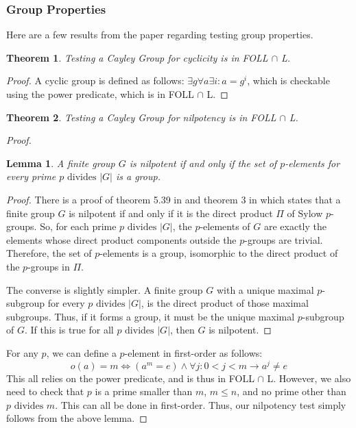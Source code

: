 \documentclass[a4paper,12pt]{article}
\theoremstyle{plain}
\newtheorem{theorem}{Theorem}
\newtheorem{lemma}{Lemma}
\theoremstyle{definition}
\theoremstyle{remark}
\begin{document}
\subsubsection{Group Properties}
Here are a few results from the paper regarding testing group properties.
\begin{theorem}
  Testing a Cayley Group for cyclicity is in FOLL $\cap$ L.
\end{theorem}
\begin{proof}
  A cyclic group is defined as follows: $\exists g\forall a\exists i:a=g^i$, which is checkable using the power predicate, which is in FOLL $\cap$ L.
\end{proof}
\begin{theorem}
  Testing a Cayley Group for nilpotency is in FOLL $\cap$ L.
\end{theorem}
\begin{proof}
  \begin{lemma}
    A finite group $G$ is nilpotent if and only if the set of $p$-elements for every prime $p\text{ divides }|G|$ is a group.
  \end{lemma}
  \begin{proof}
    There is a proof of theorem 5.39 in \cite{Rotman1999-zp} and theorem 3 in \cite{Dummit2003-ki} which states that a finite group $G$ is nilpotent if and only if it is the direct product $\Pi$ of Sylow $p$-groups. So, for each prime $p\text{ divides }|G|$, the $p$-elements of $G$ are exactly the elements whose direct product components outside the $p$-groups are trivial. Therefore, the set of $p$-elements is a group, isomorphic to the direct product of the $p$-groups in $\Pi$. \vspace{\baselineskip}

    The converse is slightly simpler. A finite group $G$ with a unique maximal $p$-subgroup for every $p\text{ divides }|G|$, is the direct product of those maximal subgroups. Thus, if it forms a group, it must be the unique maximal $p$-subgroup of $G$. If this is true for all $p\text{ divides }|G|$, then $G$ is nilpotent.
  \end{proof}
  For any $p$, we can define a $p$-element in first-order as follows:
  $$o(a)=m\iff(a^m=e)\land\forall j:0<j<m\to a^j\neq e$$
  This all relies on the power predicate, and is thus in FOLL $\cap$ L. However, we also need to check that $p$ is a prime smaller than $m$, $m\leq n$, and no prime other than $p\text{ divides } m$. This can all be done in first-order. Thus, our nilpotency test simply follows from the above lemma.
\end{proof}
\end{document}
